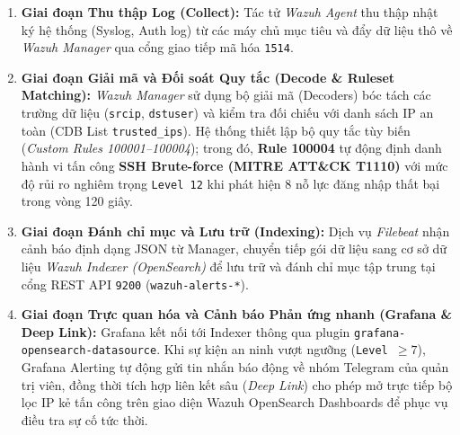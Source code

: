 \documentclass[13pt,a4paper]{extarticle}
\begin{document}
\begin{enumerate}
    \item \textbf{Giai đoạn Thu thập Log (Collect):} Tác tử \textit{Wazuh Agent} thu thập nhật ký hệ thống (Syslog, Auth log) từ các máy chủ mục tiêu và đẩy dữ liệu thô về \textit{Wazuh Manager} qua cổng giao tiếp mã hóa \texttt{1514}.
    \item \textbf{Giai đoạn Giải mã và Đối soát Quy tắc (Decode \& Ruleset Matching):} \textit{Wazuh Manager} sử dụng bộ giải mã (Decoders) bóc tách các trường dữ liệu (\texttt{srcip}, \texttt{dstuser}) và kiểm tra đối chiếu với danh sách IP an toàn (CDB List \texttt{trusted\_ips}). Hệ thống thiết lập bộ quy tắc tùy biến (\textit{Custom Rules 100001--100004}); trong đó, \textbf{Rule 100004} tự động định danh hành vi tấn công \textbf{SSH Brute-force (MITRE ATT\&CK T1110)} với mức độ rủi ro nghiêm trọng \texttt{Level 12} khi phát hiện 8 nỗ lực đăng nhập thất bại trong vòng 120 giây.
    \item \textbf{Giai đoạn Đánh chỉ mục và Lưu trữ (Indexing):} Dịch vụ \textit{Filebeat} nhận cảnh báo định dạng JSON từ Manager, chuyển tiếp gói dữ liệu sang cơ sở dữ liệu \textit{Wazuh Indexer (OpenSearch)} để lưu trữ và đánh chỉ mục tập trung tại cổng REST API \texttt{9200} (\texttt{wazuh-alerts-*}).
    \item \textbf{Giai đoạn Trực quan hóa và Cảnh báo Phản ứng nhanh (Grafana \& Deep Link):} Grafana kết nối tới Indexer thông qua plugin \texttt{grafana-opensearch-datasource}. Khi sự kiện an ninh vượt ngưỡng (\texttt{Level $\ge 7$}), Grafana Alerting tự động gửi tin nhắn báo động về nhóm Telegram của quản trị viên, đồng thời tích hợp liên kết sâu (\textit{Deep Link}) cho phép mở trực tiếp bộ lọc IP kẻ tấn công trên giao diện Wazuh OpenSearch Dashboards để phục vụ điều tra sự cố tức thời.
\end{enumerate}
\end{document}
